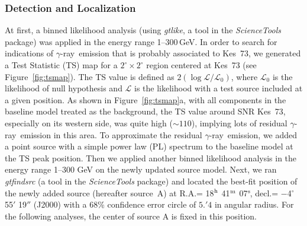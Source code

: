 \documentclass[12pt,preprint]{aastex}
\newcommand{\gray}{{\rm $\gamma$-ray}}
\begin{document}
\subsubsection{Detection and Localization}
\label{subsec:loc}
At first,  a binned likelihood analysis (using \textit{gtlike}, 
a tool in the \emph{ScienceTools} package) 
was applied in the energy range 1--300\,GeV.
In order to search for indications of \gray\ emission 
that is probably associated to Kes~73,
we generated a Test Statistic (TS) map for a 
$2^{\circ}\times2^{\circ}$ region centered at Kes~73 (see Figure~\ref{fig:tsmap}). 
The TS value is defined as
 $2(\log{\mathcal L}/{\mathcal L}_0)$, where ${\mathcal L}_0$ is
the likelihood of null hypothesis and ${\mathcal L}$ is
the likelihood with a test source included at a given position.
As shown in Figure~\ref{fig:tsmap}a,
with all components in the baseline model treated as the background,
 the TS value around SNR Kes~73, especially on its western side, was quite high ($\sim110$),
implying lots of residual \gray\ emission in this area.
To approximate the residual \gray\ emission, 
we added a point source with a simple power law (PL) spectrum 
to the baseline model at the TS peak position. 
Then we applied another binned likelihood analysis 
in the energy range 1--300 GeV on the newly updated source model.
Next, we ran \textit{gtfindsrc} (a tool in the \emph{ScienceTools} package) 
and located the best-fit position of the newly added source (hereafter source~A)
at R.A.= 18$^{\rm h}$ 41$^{\rm m}$ 07$^{\rm s}\!$, 
decl.= $-$4$^{\circ}$ 55$'$ 19$''\!$ (J2000)
with a 68\% confidence error circle of $5.'4$ in angular radius.
For the following analyses, the center of source A is 
fixed in this position.
\end{document}
